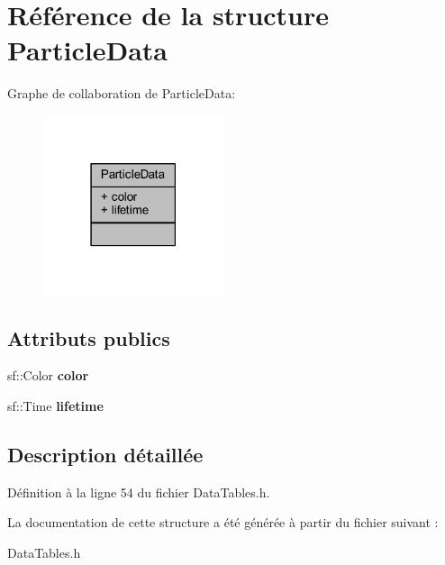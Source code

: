 \hypertarget{struct_particle_data}{}\section{Référence de la structure Particle\+Data}
\label{struct_particle_data}


Graphe de collaboration de Particle\+Data\+:\nopagebreak
\begin{figure}[H]
\begin{center}
\leavevmode
\includegraphics[width=150pt]{struct_particle_data__coll__graph}
\end{center}
\end{figure}
\subsection*{Attributs publics}
\begin{DoxyCompactItemize}
\item 
\hypertarget{struct_particle_data_afa0053ef8a9959f37c6f894126702a10}{}\label{struct_particle_data_afa0053ef8a9959f37c6f894126702a10} 
sf\+::\+Color {\bfseries color}
\item 
\hypertarget{struct_particle_data_a5007b50cb3d71464de03216d5649108a}{}\label{struct_particle_data_a5007b50cb3d71464de03216d5649108a} 
sf\+::\+Time {\bfseries lifetime}
\end{DoxyCompactItemize}


\subsection{Description détaillée}


Définition à la ligne 54 du fichier Data\+Tables.\+h.



La documentation de cette structure a été générée à partir du fichier suivant \+:\begin{DoxyCompactItemize}
\item 
Data\+Tables.\+h\end{DoxyCompactItemize}
